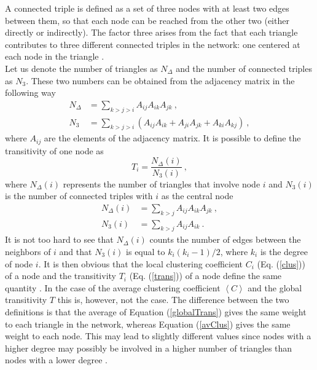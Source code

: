 \documentclass[11 pt , letterpaper , twoside , openright]{book}
\begin{document}
\newline
A connected triple is defined as a set of three nodes with at least two edges between them, so that each node can be reached from the other two (either directly or indirectly). The factor three arises from the fact that each triangle contributes to three different connected triples in the network: one centered at each node in the triangle \cite{F.Costa2007}. \\
\newline
Let us denote the number of triangles as $N_{\Delta}$ and the number of connected triples as $N_3$. These two numbers can be obtained from the adjacency matrix in the following way \cite{F.Costa2007}
\begin{align}
	N_{\Delta} &= \sum_{k > j > i} A_{ij}A_{ik}A_{jk} \ , \\
	N_3 &= \sum_{k > j > i} (A_{ij}A_{ik} + A_{ji}A_{jk} + A_{ki}A_{kj}) \ ,
\end{align}
where $A_{ij}$ are the elements of the adjacency matrix. It is possible to define the transitivity of one node as \cite{F.Costa2007}
\begin{equation}\label{trans}
	T_i = \frac{N_{\Delta}(i)}{N_3(i)} \ ,
\end{equation}
where $N_{\Delta}(i)$ represents the number of triangles that involve node $i$ and $N_3(i)$ is the number of connected triples with $i$ as the central node \cite{F.Costa2007}
\begin{align}
	N_{\Delta}(i) &= \sum_{k > j} A_{ij}A_{ik}A_{jk} \ , \\
	N_3(i) &= \sum_{k > j} A_{ij}A_{ik} \ .
\end{align}
It is not too hard to see that $N_{\Delta}(i)$ counts the number of edges between the neighbors of $i$ and that $N_3(i)$ is equal to $k_i(k_i-1)/2$, where $k_i$ is the degree of node $i$. It is then obvious that the local clustering coefficient $C_i$ (Eq. (\ref{clus})) of a node and the transitivity $T_i$ (Eq. (\ref{trans})) of a node define the same quantity \cite{F.Costa2007}. In the case of the average clustering coefficient $\left<C\right>$ and the global transitivity $T$ this is, however, not the case. The difference between the two definitions is that the average of Equation (\ref{globalTrans}) gives the same weight to each triangle in the network, whereas Equation (\ref{avClus}) gives the same weight to each node. This may lead to slightly different values since nodes with a higher degree may possibly be involved in a higher number of triangles than nodes with a lower degree \cite{F.Costa2007}.
	
\end{document}
